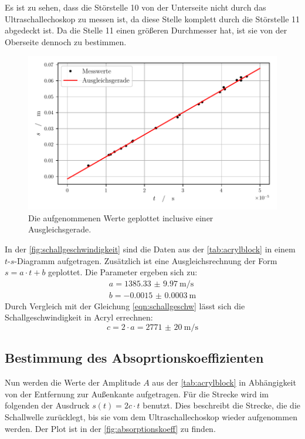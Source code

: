   \noindent Es ist zu sehen, dass die Störstelle 10 von der Unterseite nicht durch das Ultraschallechoskop zu messen ist, da diese Stelle komplett durch die 
  Störstelle 11 abgedeckt ist. Da die Stelle 11 einen größeren Durchmesser hat, ist sie von der Oberseite dennoch zu bestimmen. 

  \begin{figure}[H]
    \centering
    \includegraphics[width=\textwidth]{build/schallgeschwindigkeit.pdf}
    \caption{Die aufgenommenen Werte geplottet inclusive einer Ausgleichsgerade.}
    \label{fig:schallgeschwindigkeit}    
  \end{figure}

  \noindent In der \autoref{fig:schallgeschwindigkeit} sind die Daten aus der \autoref{tab:acrylblock} in einem $t$-$s$-Diagramm aufgetragen. Zusätzlich 
  ist eine Ausgleichsrechnung der Form $ s = a \cdot t + b $ geplottet. Die Parameter ergeben sich zu:
  \begin{align*}
    a = \SI{1385.33(997)}{\metre\per\second}\\
    b = \SI{-0.0015(3)}{\metre}
  \end{align*}
  Durch Vergleich mit der Gleichung \eqref{eqn:schallgeschw} lässt sich die Schallgeschwindigkeit in Acryl errechnen:
  \begin{equation*}
    c = 2 \cdot a = \SI{2771(20)}{\metre\per\second}
  \end{equation*}


\subsection{Bestimmung des Absoprtionskoeffizienten}

  Nun werden die Werte der Amplitude $A$ aus der \autoref{tab:acrylblock} in Abhängigkeit von der Entfernung zur Außenkante aufgetragen. Für die Strecke 
  wird im folgenden der Ausdruck $ s(t) = 2c \cdot t $ benutzt. Dies beschreibt die Strecke, die die Schallwelle zurücklegt, bis sie vom dem Ultraschallechoskop
  wieder aufgenommen werden. Der Plot ist in der \autoref{fig:absorptionskoeff} zu finden. 

